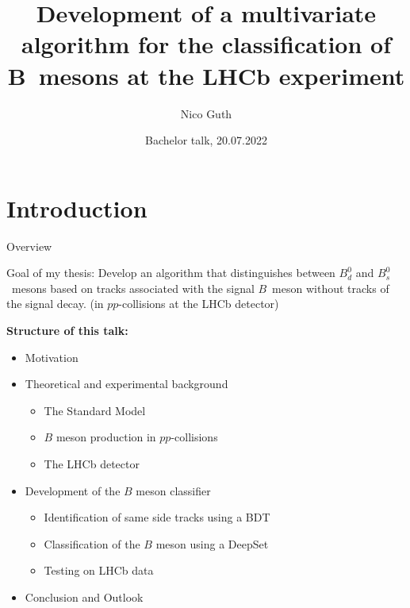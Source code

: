 \documentclass[aspectratio=1610, 10pt]{beamer}
\title{Development of a multivariate algorithm for the classification of B~mesons at the LHCb experiment}
\author[N.~Guth]{Nico Guth}
\institute[AG Albrecht]{Arbeitsgruppe Albrecht \\ Fakultät Physik}
\date{Bachelor talk, 20.07.2022}
\begin{document}
\maketitle

\section*{Introduction}

\begin{frame}{Overview}
  \begin{block}{Goal of my thesis:}
    Develop an algorithm that distinguishes between $B^0_d$ and $B^0_s$~mesons based on tracks associated with the signal $B$~meson without tracks of the signal decay. (in $pp$-collisions at the LHCb detector) 
  \end{block}

  \medskip
  \textbf{Structure of this talk:}
  \begin{itemize}
    \item Motivation
    \item Theoretical and experimental background
      \begin{itemize}
        \item The Standard Model
        \item $B$ meson production in $pp$-collisions
        \item The LHCb detector
      \end{itemize}
    \item Development of the $B$ meson classifier
      \begin{itemize}
        \item Identification of same side tracks using a BDT
        \item Classification of the $B$ meson using a DeepSet
        \item Testing on LHCb data
      \end{itemize}
    \item Conclusion and Outlook
  \end{itemize}

\end{frame}
\end{document}
